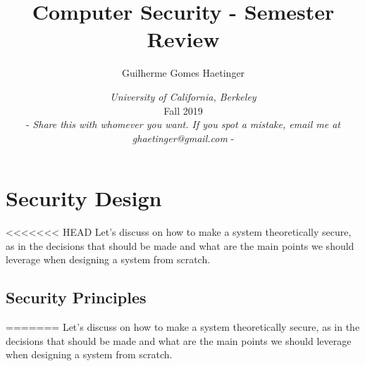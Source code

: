 \documentclass[11pt]{article}
\author{Guilherme Gomes Haetinger}
\date{\emph{University of California, Berkeley} \\ Fall 2019 \\ - \emph{Share this with whomever you want. If you spot a mistake, email me at ghaetinger@gmail.com} -}
\title{\huge Computer Security - Semester Review}
\begin{document}
\maketitle
\tableofcontents


\section{Security Design}
<<<<<<< HEAD
\label{sec:org189b1fc}
Let's discuss on how to make a system theoretically secure, as in the decisions that should be made and what are the main points we should leverage when designing a system from scratch. 
\subsection{Security Principles}
\label{sec:org2980c0d}
=======
\label{sec:orgff31437}
Let's discuss on how to make a system theoretically secure, as in the decisions that should be made and what are the main points we should leverage when designing a system from scratch. 
\end{document}
